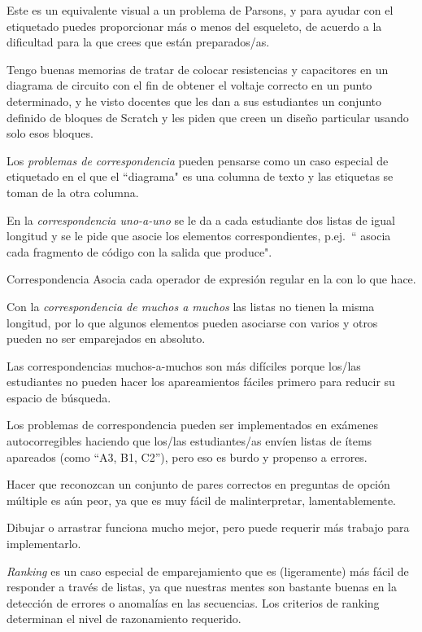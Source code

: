 Este es un equivalente visual a un problema de Parsons, 
y para ayudar con el etiquetado puedes proporcionar más o menos del esqueleto, de acuerdo a la dificultad para la que crees que están preparados/as.

Tengo buenas memorias de tratar de colocar resistencias y capacitores en un diagrama de circuito con el fin de obtener el voltaje correcto en un punto determinado, y he visto docentes que les dan a sus estudiantes un conjunto definido de bloques de Scratch  y les piden que creen un diseño particular usando solo esos bloques.

Los \emph{problemas de correspondencia} pueden pensarse como un caso especial de etiquetado 
en el que el ``diagrama" es una columna de texto 
y las etiquetas se toman de la otra columna.

En la \emph{correspondencia uno-a-uno} se le da a cada estudiante dos listas de igual longitud y se le pide que asocie los elementos correspondientes, 
p.ej.\ `` asocia cada fragmento de código con la salida que produce".

\begin{aside}{Correspondencia}
  Asocia cada operador de expresión regular en la 
  con lo que hace.
\end{aside}


Con la \emph{correspondencia de muchos a muchos} las listas no tienen la misma longitud, por lo que algunos elementos pueden asociarse con varios
y otros pueden no ser emparejados en absoluto.

Las correspondencias muchos-a-muchos son más difíciles 
porque los/las estudiantes no pueden hacer los apareamientos fáciles primero para reducir su espacio de búsqueda.

Los problemas de correspondencia pueden ser implementados en exámenes autocorregibles haciendo que los/las estudiantes/as envíen listas de ítems apareados 
(como ``A3, B1, C2''), 
pero eso es burdo y propenso a errores.

Hacer que reconozcan un conjunto de pares correctos en preguntas de opción múltiple es aún peor, 
ya que es muy fácil de malinterpretar, lamentablemente.

Dibujar o arrastrar funciona mucho mejor, 
pero puede requerir más trabajo para implementarlo.


\emph{Ranking} es un caso especial de emparejamiento 
que es (ligeramente) más fácil de responder a través de listas, 
ya que nuestras mentes son bastante buenas en la detección de errores o anomalías en las secuencias.
Los criterios de ranking determinan el nivel de razonamiento requerido.

